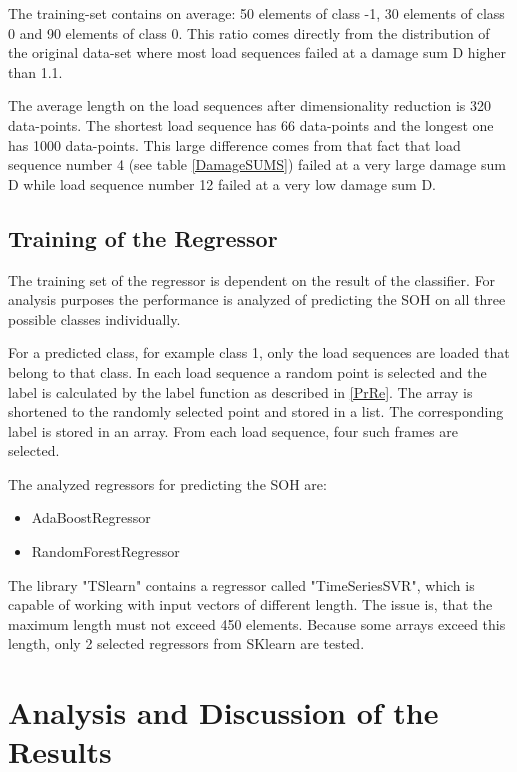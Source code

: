 The training-set contains on average: 50 elements of class -1,  30 elements of class 0 and 90 elements of class 0. This ratio comes directly from the distribution of the original data-set where most load sequences failed at a damage sum D higher than 1.1.

The average length on the load sequences after dimensionality reduction is 320 data-points. The shortest load sequence has 66 data-points and the longest one has 1000 data-points. This large difference comes from that fact that load sequence number 4 (see table \ref{DamageSUMS}) failed at a very large damage sum D while load sequence number 12 failed at a very low damage sum D.  

\subsection{Training of the Regressor}
The training set of the regressor is dependent on the result of the classifier. For analysis purposes the performance is analyzed of predicting the SOH on all three possible classes individually. 

For a predicted class, for example class 1, only the load sequences are loaded that belong to that class. In each load sequence a random point is selected and the label is calculated by the label function as described in \ref{PrRe}. The array is shortened to the randomly selected point and stored in a list. The corresponding label is stored in an array. From each load sequence, four such frames are selected.

The analyzed regressors for predicting the SOH are:
\begin{itemize} 
	\itemsep-0.5em 
	\item AdaBoostRegressor \cite{tslearn}
	\item RandomForestRegressor \cite{tslearn}
\end{itemize}

The library "TSlearn" \cite{tslearn} contains a regressor called "TimeSeriesSVR", which is capable of working with input vectors of different length. The issue is, that the maximum length must not exceed 450 elements. Because some arrays exceed this length, only 2 selected regressors from SKlearn \cite{SKlearn} are tested. 

\section{Analysis and Discussion of the Results}

